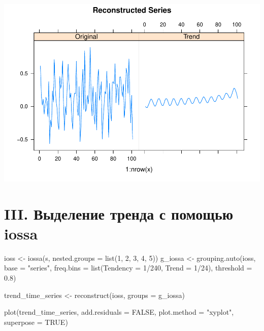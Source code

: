 \documentclass[
]{article}
\newenvironment{Shaded}{\begin{snugshade}}{\end{snugshade}}
\newcommand{\AttributeTok}[1]{\textcolor[rgb]{0.77,0.63,0.00}{#1}}
\newcommand{\ConstantTok}[1]{\textcolor[rgb]{0.00,0.00,0.00}{#1}}
\newcommand{\DecValTok}[1]{\textcolor[rgb]{0.00,0.00,0.81}{#1}}
\newcommand{\FloatTok}[1]{\textcolor[rgb]{0.00,0.00,0.81}{#1}}
\newcommand{\FunctionTok}[1]{\textcolor[rgb]{0.00,0.00,0.00}{#1}}
\newcommand{\NormalTok}[1]{#1}
\newcommand{\OtherTok}[1]{\textcolor[rgb]{0.56,0.35,0.01}{#1}}
\newcommand{\SpecialCharTok}[1]{\textcolor[rgb]{0.00,0.00,0.00}{#1}}
\newcommand{\StringTok}[1]{\textcolor[rgb]{0.31,0.60,0.02}{#1}}
\begin{document}
\includegraphics{decomposition-1.pdf}

\hypertarget{iii.-ux432ux44bux434ux435ux43bux435ux43dux438ux435-ux442ux440ux435ux43dux434ux430-ux441-ux43fux43eux43cux43eux449ux44cux44e-iossa}{%
\section{III. Выделение тренда с помощью
iossa}\label{iii.-ux432ux44bux434ux435ux43bux435ux43dux438ux435-ux442ux440ux435ux43dux434ux430-ux441-ux43fux43eux43cux43eux449ux44cux44e-iossa}}

\begin{Shaded}
\begin{Highlighting}[]
\NormalTok{  ioss }\OtherTok{\textless{}{-}} \FunctionTok{iossa}\NormalTok{(s, }\AttributeTok{nested.groups =} \FunctionTok{list}\NormalTok{(}\DecValTok{1}\NormalTok{, }\DecValTok{2}\NormalTok{, }\DecValTok{3}\NormalTok{, }\DecValTok{4}\NormalTok{, }\DecValTok{5}\NormalTok{))}
\NormalTok{  g\_iossa }\OtherTok{\textless{}{-}} \FunctionTok{grouping.auto}\NormalTok{(ioss, }\AttributeTok{base =} \StringTok{"series"}\NormalTok{, }
                 \AttributeTok{freq.bins =} \FunctionTok{list}\NormalTok{(}\AttributeTok{Tendency =} \DecValTok{1}\SpecialCharTok{/}\DecValTok{240}\NormalTok{, }\AttributeTok{Trend =} \DecValTok{1}\SpecialCharTok{/}\DecValTok{24}\NormalTok{), }
                 \AttributeTok{threshold =} \FloatTok{0.8}\NormalTok{)}
                 
\NormalTok{  trend\_time\_series }\OtherTok{\textless{}{-}} \FunctionTok{reconstruct}\NormalTok{(ioss, }\AttributeTok{groups =}\NormalTok{ g\_iossa)}
  
  \FunctionTok{plot}\NormalTok{(trend\_time\_series, }
   \AttributeTok{add.residuals =} \ConstantTok{FALSE}\NormalTok{, }
   \AttributeTok{plot.method =} \StringTok{"xyplot"}\NormalTok{, }\AttributeTok{superpose =} \ConstantTok{TRUE}\NormalTok{)}
\end{Highlighting}
\end{Shaded}
\end{document}
